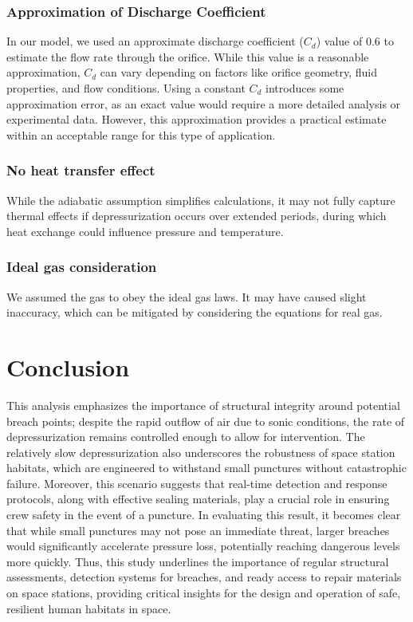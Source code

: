 \documentclass[a4paper, 14pt]{extarticle}
\begin{document}
\subsubsection*{Approximation of Discharge Coefficient}
In our model, we used an approximate discharge coefficient ($C_d$) value of 0.6 to estimate the flow rate through the orifice. While this value is a reasonable approximation, $C_d$ can vary depending on factors like orifice geometry, fluid properties, and flow conditions. Using a constant $C_d$ introduces some approximation error, as an exact value would require a more detailed analysis or experimental data. However, this approximation provides a practical estimate within an acceptable range for this type of application.
\subsubsection*{No heat transfer effect}
While the adiabatic assumption simplifies calculations, it may not fully capture thermal effects if depressurization occurs over extended periods, during which heat exchange could influence pressure and temperature.
\subsubsection*{Ideal gas consideration}
We assumed the gas to obey the ideal gas laws. It may have caused slight inaccuracy, which can be mitigated by considering the equations for real gas.
\section{Conclusion}
This analysis emphasizes the importance of structural integrity around potential breach points; despite the rapid outflow of air due to sonic conditions, the rate of depressurization remains controlled enough to allow for intervention. The relatively slow depressurization also underscores the robustness of space station habitats, which are engineered to withstand small punctures without catastrophic failure. Moreover, this scenario suggests that real-time detection and response protocols, along with effective sealing materials, play a crucial role in ensuring crew safety in the event of a puncture.
In evaluating this result, it becomes clear that while small punctures may not pose an immediate threat, larger breaches would significantly accelerate pressure loss, potentially reaching dangerous levels more quickly. Thus, this study underlines the importance of regular structural assessments, detection systems for breaches, and ready access to repair materials on space stations, providing critical insights for the design and operation of safe, resilient human habitats in space.
\end{document}
